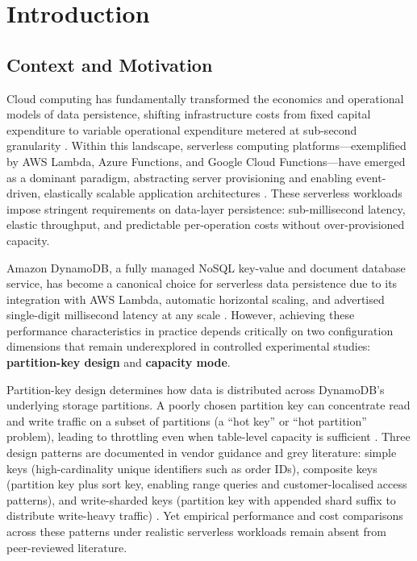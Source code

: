 \section{Introduction}

\subsection{Context and Motivation}

Cloud computing has fundamentally transformed the economics and operational models of data persistence, shifting infrastructure costs from fixed capital expenditure to variable operational expenditure metered at sub-second granularity \citep{haubenschild2025oltp, vanrenen2023cloud}. Within this landscape, serverless computing platforms—exemplified by AWS Lambda, Azure Functions, and Google Cloud Functions—have emerged as a dominant paradigm, abstracting server provisioning and enabling event-driven, elastically scalable application architectures \citep{bodner2025serverless, liu2023faaslight}. These serverless workloads impose stringent requirements on data-layer persistence: sub-millisecond latency, elastic throughput, and predictable per-operation costs without over-provisioned capacity.

Amazon DynamoDB, a fully managed NoSQL key-value and document database service, has become a canonical choice for serverless data persistence due to its integration with AWS Lambda, automatic horizontal scaling, and advertised single-digit millisecond latency at any scale \citep{elhemali2022dynamodb, idziorek2023transactions}. However, achieving these performance characteristics in practice depends critically on two configuration dimensions that remain underexplored in controlled experimental studies: \textbf{partition-key design} and \textbf{capacity mode}.

Partition-key design determines how data is distributed across DynamoDB's underlying storage partitions. A poorly chosen partition key can concentrate read and write traffic on a subset of partitions (a ``hot key'' or ``hot partition'' problem), leading to throttling even when table-level capacity is sufficient \citep{aws2025adaptive}. Three design patterns are documented in vendor guidance and grey literature: simple keys (high-cardinality unique identifiers such as order IDs), composite keys (partition key plus sort key, enabling range queries and customer-localised access patterns), and write-sharded keys (partition key with appended shard suffix to distribute write-heavy traffic) \citep{aws2025sharding, eldeeb2022neuroshard}. Yet empirical performance and cost comparisons across these patterns under realistic serverless workloads remain absent from peer-reviewed literature.


